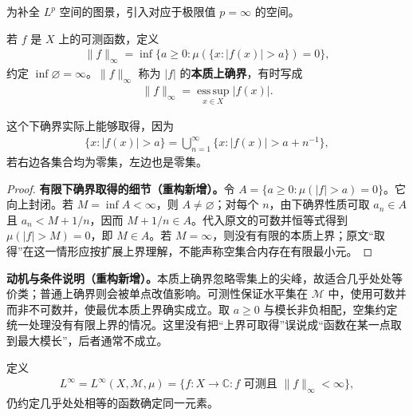 \documentclass[../../main.tex]{subfiles}
\begin{document}
为补全 $L^p$ 空间的图景，引入对应于极限值 $p=\infty$ 的空间。
\begin{definition}[本质上确界]\label{definition:ch06-essential-supremum}
若 $f$ 是 $X$ 上的可测函数，定义
\begin{align*}
\|f\|_\infty=\inf\{a\geqslant0:\mu(\{x:|f(x)|>a\})=0\},
\end{align*}
约定 $\inf\varnothing=\infty$。$\|f\|_\infty$ 称为 $|f|$ 的\textbf{本质上确界}，有时写成
\begin{align*}
\|f\|_\infty=\operatorname*{ess\,sup}_{x\in X}|f(x)|.
\end{align*}
\end{definition}
这个下确界实际上能够取得，因为
\begin{align*}
\{x:|f(x)|>a\}=\bigcup_{n=1}^{\infty}\{x:|f(x)|>a+n^{-1}\},
\end{align*}
若右边各集合均为零集，左边也是零集。
\begin{proof}
\textbf{有限下确界取得的细节（重构新增）。}令 $A=\{a\geqslant0:\mu(|f|>a)=0\}$。它向上封闭。若 $M=\inf A<\infty$，则 $A\ne\varnothing$；对每个 $n$，由下确界性质可取 $a_n\in A$ 且 $a_n<M+1/n$，因而 $M+1/n\in A$。代入原文的可数并恒等式得到 $\mu(|f|>M)=0$，即 $M\in A$。若 $M=\infty$，则没有有限的本质上界；原文“取得”在这一情形应按扩展上界理解，不能声称空集合内存在有限最小元。
\end{proof}
\begin{remark}
\textbf{动机与条件说明（重构新增）。}本质上确界忽略零集上的尖峰，故适合几乎处处等价类；普通上确界则会被单点改值影响。可测性保证水平集在 $\mathscr M$ 中，使用可数并而非不可数并，使最优本质上界确实成立。取 $a\geqslant0$ 与模长非负相配，空集约定统一处理没有有限上界的情况。这里没有把“上界可取得”误说成“函数在某一点取到最大模长”，后者通常不成立。
\end{remark}
\begin{definition}[$L^\infty$ 空间]\label{definition:ch06-linfty}
定义
\begin{align*}
L^\infty=L^\infty(X,\mathscr M,\mu)=\{f:X\to\mathbb C:f\text{ 可测且 }\|f\|_\infty<\infty\},
\end{align*}
仍约定几乎处处相等的函数确定同一元素。
\end{definition}
\end{document}

